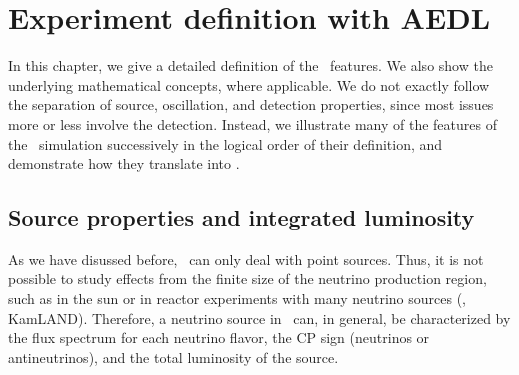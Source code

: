 \chapter{Experiment definition with AEDL}

In this chapter, we give a detailed definition of the \AEDL\ features. We also show the underlying mathematical concepts, where applicable. We do not exactly follow the separation of source, oscillation, and detection properties, since most issues more or less involve the detection. Instead,
we illustrate many of the features of the \GLOBES\ simulation successively
in the logical order of their definition, and demonstrate how they translate into \AEDL .

\section{Source properties and integrated luminosity}
\label{sec:source}

As we have disussed before, \GLOBES\ can only deal with point sources. Thus,  it is not possible to study effects from the finite size of the neutrino production region, such as in the sun or in reactor experiments with many
neutrino sources (\eg, KamLAND). Therefore, a neutrino source in \GLOBES\ can, in general, be characterized by the flux spectrum for each neutrino flavor, the CP sign (neutrinos or antineutrinos), and the total luminosity
of the source.

